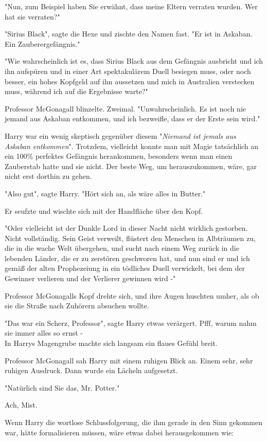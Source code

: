{"Nun, zum Beispiel haben Sie erwähnt, dass meine Eltern verraten wurden. Wer hat sie verraten?"

"Sirius Black", sagte die Hexe und zischte den Namen fast. "Er ist in Askaban. Ein Zauberergefängnis."

"Wie wahrscheinlich ist es, dass Sirius Black aus dem Gefängnis ausbricht und ich ihn aufspüren und in einer Art spektakulärem Duell besiegen muss, oder noch besser, ein hohes Kopfgeld auf ihn aussetzen und mich in Australien verstecken muss, während ich auf die Ergebnisse warte?"

Professor McGonagall blinzelte. Zweimal. "Unwahrscheinlich. Es ist noch nie jemand aus Askaban entkommen, und ich bezweifle, dass er der Erste sein wird."

Harry war ein wenig skeptisch gegenüber diesem "\emph{Niemand ist jemals aus Askaban entkommen}". Trotzdem, vielleicht konnte man mit Magie tatsächlich an ein 100\% perfektes Gefängnis herankommen, besonders wenn man einen Zauberstab hatte und sie nicht. Der beste Weg, um herauszukommen, wäre, gar nicht erst dorthin zu gehen.

"Also gut", sagte Harry. "Hört sich an, als wäre alles in Butter."

Er seufzte und wischte sich mit der Handfläche über den Kopf.

"Oder vielleicht ist der Dunkle Lord in dieser Nacht nicht wirklich gestorben. Nicht vollständig. Sein Geist verweilt, flüstert den Menschen in Albträumen zu, die in die wache Welt übergehen, und sucht nach einem Weg zurück in die lebenden Länder, die er zu zerstören geschworen hat, und nun sind er und ich gemäß der alten Prophezeiung in ein tödliches Duell verwickelt, bei dem der Gewinner verlieren und der Verlierer gewinnen wird -"

Professor McGonagalls Kopf drehte sich, und ihre Augen huschten umher, als ob sie die Straße nach Zuhörern absuchen wollte.

"Das war ein Scherz, Professor", sagte Harry etwas verärgert. Pfff, warum nahm sie immer alles so ernst -\\ In Harrys Magengrube machte sich langsam ein flaues Gefühl breit.

Professor McGonagall sah Harry mit einem ruhigen Blick an. Einem sehr, sehr ruhigen Ausdruck. Dann wurde ein Lächeln aufgesetzt.

"Natürlich sind Sie das, Mr. Potter."

Ach, Mist.

Wenn Harry die wortlose Schlussfolgerung, die ihm gerade in den Sinn gekommen war, hätte formalisieren müssen, wäre etwas dabei herausgekommen wie:

}
